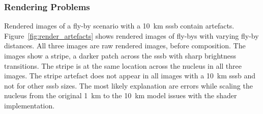 \subsubsection{Rendering Problems} \label{sec:render_problems}
Rendered images of a fly-by scenario with a \SI{10}{\kilo\meter} \gls{sssb} contain artefacts. Figure~\ref{fig:render_artefacts} shows rendered images of fly-bys with varying fly-by distances. All three images are raw rendered images, before composition. The images show a stripe, a darker patch across the \gls{sssb} with sharp brightness transitions. The stripe is at the same location across the nucleus in all three images. The stripe artefact does not appear in all images with a \SI{10}{\kilo\meter} \gls{sssb} and not for other \gls{sssb} sizes. The most likely explanation are errors while scaling the nucleus from the original \SI{1}{\kilo\meter} to the \SI{10}{\kilo\meter} model issues with the shader implementation.
